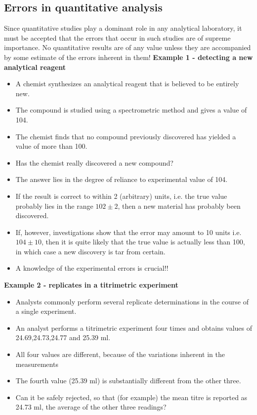 \subsection{Errors in quantitative analysis}
Since quantitative studies play a dominant role in any analytical laboratory, it must be accepted that the errors that occur in such studies are of supreme importance. No quantitative results are of any value unless they are accompanied by some estimate of the errors inherent in them!
\newpage
\noindent \textbf{Example 1 - detecting a new analytical reagent}\\
\begin{itemize} \item A chemist synthesizes an analytical reagent that is believed to be entirely new.
	\item The compound is studied using a spectrometric method and gives a
	value of 104.
	\item The chemist finds that no compound previously discovered has yielded
	a value of more than 100.
	\item Has the chemist really discovered a new compound?
	\item The answer lies in the degree of reliance to experimental value of 104.
	\item If the result is correct to within 2 (arbitrary) units, i.e. the true value
	probably lies in the range $102\pm 2$, then a new material has probably
	been discovered.
	\item If, however, investigations show that the error may amount to 10 units
	i.e. $104 \pm 10$, then it is quite likely that the true value is actually less than
	100, in which case a new discovery is tar from certain.
	\item A knowledge of the experimental errors is crucial!!
\end{itemize}

\newpage
\textbf{Example 2 - replicates in a titrimetric experiment}\\
\begin{itemize}
	\item Analysts commonly perform several replicate determinations in the
	course of a single experiment.
	\item An analyst performs a titrimetric experiment four times and obtains
	values of 24.69,24.73,24.77 and 25.39 ml.
	\item All four values are different, because of the variations inherent in the
	measurements
	\item The fourth value (25.39 ml) is substantially different from the other three.
	\item Can it be safely rejected, so that (for example) the mean titre is reported
	as 24.73 ml, the average of the other three readings?
\end{itemize}

